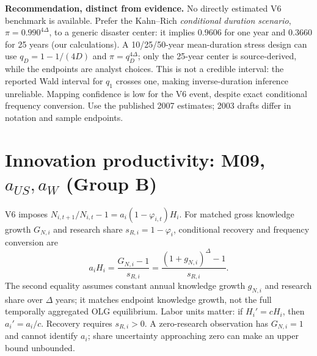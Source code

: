 \documentclass[10pt,a4paper,landscape]{article}
\begin{document}
\noindent\textbf{Recommendation, distinct from evidence.}
No directly estimated V6 benchmark is available. Prefer the Kahn--Rich
\emph{conditional duration scenario}, $\pi=0.990^{4\Delta}$, to a generic
disaster center: it implies $0.9606$ for one year and $0.3660$ for 25 years
(our calculations). A 10/25/50-year mean-duration stress design can use
$q_D=1-1/(4D)$ and $\pi=q_D^{4\Delta}$; only the 25-year center is
source-derived, while the endpoints are analyst choices. This is not a
credible interval: the reported Wald interval for $q_1$ crosses one, making
inverse-duration inference unreliable. Mapping confidence is low for the
V6 event, despite exact conditional frequency conversion. Use the published
2007 estimates; 2003 drafts differ in notation and sample endpoints.

\clearpage
\section[Innovation productivity: M09, a US ,a W (Group B)]{Innovation productivity: M09, $a_{US},a_W$ (Group B)}

V6 imposes $N_{i,t+1}/N_{i,t}-1=a_i(1-\varphi_{i,t})H_i$.
For matched gross knowledge growth $G_{N,i}$ and research share
$s_{R,i}=1-\varphi_i$, conditional recovery and frequency conversion are
\[
 a_iH_i=\frac{G_{N,i}-1}{s_{R,i}}
       =\frac{(1+g_{N,i})^\Delta-1}{s_{R,i}}.
\]
The second equality assumes constant annual knowledge growth $g_{N,i}$ and
research share over $\Delta$ years; it matches endpoint knowledge growth,
not the full temporally aggregated OLG equilibrium. Labor units matter:
if $H_i'=cH_i$, then $a_i'=a_i/c$.
Recovery requires $s_{R,i}>0$. A zero-research observation has $G_{N,i}=1$
and cannot identify $a_i$; share uncertainty approaching zero can make
an upper bound unbounded.
\end{document}
